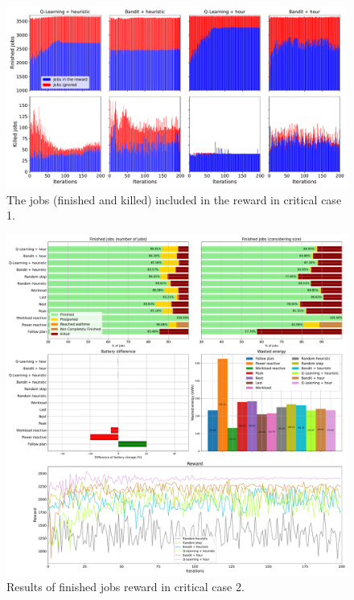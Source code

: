 \begin{figure}[!htb]
    \centering
    \includegraphics[scale=0.33]{Images/Learning_compensations/ignored_jobs_touched_scenario_1.pdf}
    \caption{The  jobs (finished and killed) included in the reward in critical case 1.}
    \label{fig:reward_from_jobs_critical_1}
\end{figure}

\begin{figure}[!htb]
    \centering
    \includegraphics[scale=0.29]{Images/Learning_compensations/reward_finished_touched_profile_best_workload_2_with_noise_state_delta.pdf}
    \caption{Results of finished jobs reward in critical case 2.}
    \label{fig:touched_reward_results_critical_2}
\end{figure}

